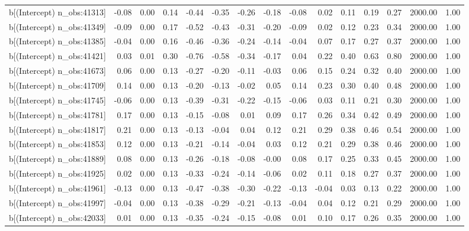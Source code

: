 \begin{table}[ht]
\begin{tabular}{rrrrrrrrrrrrrrr}
  b[(Intercept) n\_obs:41313] & -0.08 & 0.00 & 0.14 & -0.44 & -0.35 & -0.26 & -0.18 & -0.08 & 0.02 & 0.11 & 0.19 & 0.27 & 2000.00 & 1.00 \\ 
  b[(Intercept) n\_obs:41349] & -0.09 & 0.00 & 0.17 & -0.52 & -0.43 & -0.31 & -0.20 & -0.09 & 0.02 & 0.12 & 0.23 & 0.34 & 2000.00 & 1.00 \\ 
  b[(Intercept) n\_obs:41385] & -0.04 & 0.00 & 0.16 & -0.46 & -0.36 & -0.24 & -0.14 & -0.04 & 0.07 & 0.17 & 0.27 & 0.37 & 2000.00 & 1.00 \\ 
  b[(Intercept) n\_obs:41421] & 0.03 & 0.01 & 0.30 & -0.76 & -0.58 & -0.34 & -0.17 & 0.04 & 0.22 & 0.40 & 0.63 & 0.80 & 2000.00 & 1.00 \\ 
  b[(Intercept) n\_obs:41673] & 0.06 & 0.00 & 0.13 & -0.27 & -0.20 & -0.11 & -0.03 & 0.06 & 0.15 & 0.24 & 0.32 & 0.40 & 2000.00 & 1.00 \\ 
  b[(Intercept) n\_obs:41709] & 0.14 & 0.00 & 0.13 & -0.20 & -0.13 & -0.02 & 0.05 & 0.14 & 0.23 & 0.30 & 0.40 & 0.48 & 2000.00 & 1.00 \\ 
  b[(Intercept) n\_obs:41745] & -0.06 & 0.00 & 0.13 & -0.39 & -0.31 & -0.22 & -0.15 & -0.06 & 0.03 & 0.11 & 0.21 & 0.30 & 2000.00 & 1.00 \\ 
  b[(Intercept) n\_obs:41781] & 0.17 & 0.00 & 0.13 & -0.15 & -0.08 & 0.01 & 0.09 & 0.17 & 0.26 & 0.34 & 0.42 & 0.49 & 2000.00 & 1.00 \\ 
  b[(Intercept) n\_obs:41817] & 0.21 & 0.00 & 0.13 & -0.13 & -0.04 & 0.04 & 0.12 & 0.21 & 0.29 & 0.38 & 0.46 & 0.54 & 2000.00 & 1.00 \\ 
  b[(Intercept) n\_obs:41853] & 0.12 & 0.00 & 0.13 & -0.21 & -0.14 & -0.04 & 0.03 & 0.12 & 0.21 & 0.29 & 0.38 & 0.46 & 2000.00 & 1.00 \\ 
  b[(Intercept) n\_obs:41889] & 0.08 & 0.00 & 0.13 & -0.26 & -0.18 & -0.08 & -0.00 & 0.08 & 0.17 & 0.25 & 0.33 & 0.45 & 2000.00 & 1.00 \\ 
  b[(Intercept) n\_obs:41925] & 0.02 & 0.00 & 0.13 & -0.33 & -0.24 & -0.14 & -0.06 & 0.02 & 0.11 & 0.18 & 0.27 & 0.37 & 2000.00 & 1.00 \\ 
  b[(Intercept) n\_obs:41961] & -0.13 & 0.00 & 0.13 & -0.47 & -0.38 & -0.30 & -0.22 & -0.13 & -0.04 & 0.03 & 0.13 & 0.22 & 2000.00 & 1.00 \\ 
  b[(Intercept) n\_obs:41997] & -0.04 & 0.00 & 0.13 & -0.38 & -0.29 & -0.21 & -0.13 & -0.04 & 0.04 & 0.12 & 0.21 & 0.29 & 2000.00 & 1.00 \\ 
  b[(Intercept) n\_obs:42033] & 0.01 & 0.00 & 0.13 & -0.35 & -0.24 & -0.15 & -0.08 & 0.01 & 0.10 & 0.17 & 0.26 & 0.35 & 2000.00 & 1.00 \\ 

\end{tabular}
\end{table}
